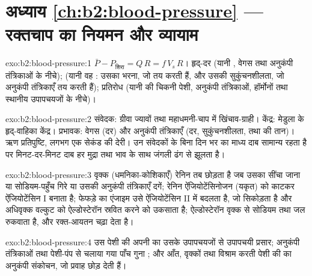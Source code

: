 \section*{अध्याय \ref{ch:b2:blood-pressure} --- रक्तचाप का नियमन और व्यायाम}

\begin{solution}{exo:b2:blood-pressure:1}
$\bar P - P_{\text{शिरा}} = Q\,R = f\,V_s\,R$। हृद्-दर (यानी
, वेगस तथा अनुकंपी तंत्रिकाओं के नीचे);
 (यानी वह : उसका भरना, जो  तय करती हैं, और उसकी
सुकुंचनशीलता, जो अनुकंपी तंत्रिकाएँ तय करती हैं); प्रतिरोध (यानी
 की चिकनी पेशी, अनुकंपी तंत्रिकाओं, हॉर्मोनों तथा
स्थानीय उपापचयजों के नीचे)।
\end{solution}

\begin{solution}{exo:b2:blood-pressure:2}
संवेदक: ग्रीवा ज्यावों तथा महाधमनी-चाप में खिंचाव-ग्राही।
केंद्र: मेडुला के हृद्-वाहिका केंद्र। प्रभावक:
वेगस (दर) और अनुकंपी तंत्रिकाएँ (दर, सुकुंचनशीलता,
 तथा  की तान)। ऋण प्रतिपुष्टि, लगभग एक सेकंड की
देरी। उन संवेदकों के बिना दिन भर का माध्य दाब
सामान्य रहता है पर मिनट-दर-मिनट दाब हर मुद्रा तथा भाव के साथ
जंगली ढंग से झूलता है।
\end{solution}

\begin{solution}{exo:b2:blood-pressure:3}
वृक्क (धमनिका-कोशिकाएँ) रेनिन तब छोड़ता है जब उसका सींचा जाना या
सोडियम-पहुँच गिरे या उसकी अनुकंपी तंत्रिकाएँ दगें; रेनिन
ऐंजियोटेंसिनोजन (यकृत) को काटकर ऐंजियोटेंसिन I बनाता है; फेफड़े का एंजाइम उसे
ऐंजियोटेंसिन II में बदलता है, जो  सिकोड़ता है और
अधिवृक्क वल्कुट को ऐल्डोस्टेरॉन स्रवित करने को उकसाता है; ऐल्डोस्टेरॉन वृक्क से
सोडियम तथा जल रुकवाता है, और रक्त-आयतन चढ़ा देता है।
\end{solution}

\begin{solution}{exo:b2:blood-pressure:4}
उस पेशी की अपनी  का उसके उपापचयजों से उपापचयी
प्रसार; अनुकंपी तंत्रिकाओं तथा पेशी-पंप से चलाया गया
पाँच गुना ; और आँत, वृक्कों तथा विश्राम करती पेशी की
 का अनुकंपी संकोचन, जो प्रवाह छोड़
देती हैं।
\end{solution}

